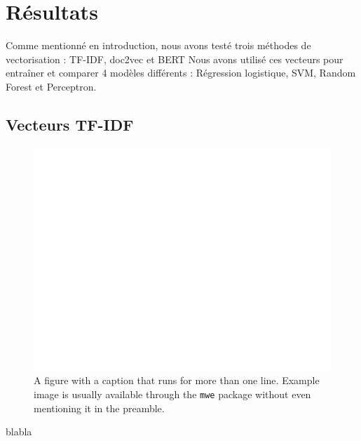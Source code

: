 \section{Résultats}

Comme mentionné en introduction, nous avons testé trois méthodes de vectorisation : TF-IDF, doc2vec et BERT
Nous avons utilisé ces vecteurs pour entraîner et comparer 4 modèles différents : Régression logistique, SVM, Random Forest et Perceptron.

\subsection{Vecteurs TF-IDF}

\begin{figure}[t]
  \includegraphics[width=\columnwidth]{assets/comparaison_metriques_bert.png}
  \caption{A figure with a caption that runs for more than one line.
    Example image is usually available through the \texttt{mwe} package
    without even mentioning it in the preamble.}
  \label{fig:tfidf_comparison}
\end{figure}

blabla